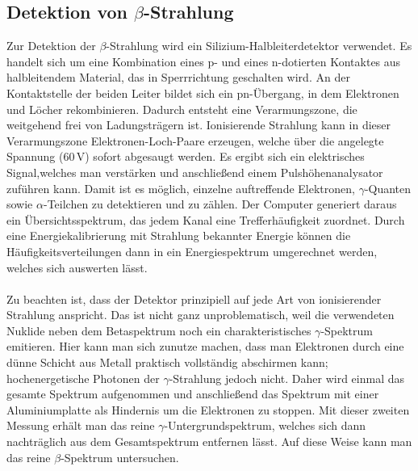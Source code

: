 \documentclass[german,  %
parskip=full,  %
]{scrartcl}
\begin{document}
\subsection{Detektion von $\beta$-Strahlung}
Zur Detektion der $\beta$-Strahlung wird ein Silizium-Halbleiterdetektor verwendet. Es handelt sich um eine Kombination eines p- und eines n-dotierten Kontaktes aus halbleitendem Material, das in Sperrrichtung geschalten wird. An der Kontaktstelle der beiden Leiter bildet sich ein pn-Übergang, in dem Elektronen und Löcher rekombinieren. Dadurch entsteht eine Verarmungszone, die weitgehend frei von Ladungsträgern ist. Ionisierende Strahlung kann in dieser Verarmungszone Elektronen-Loch-Paare erzeugen, welche über die angelegte Spannung ($60$\,V) sofort abgesaugt werden. Es ergibt sich ein elektrisches Signal,welches man verstärken und anschließend einem Pulshöhenanalysator zuführen kann. Damit ist es möglich, einzelne auftreffende Elektronen, \(\gamma\)-Quanten sowie \(\alpha\)-Teilchen zu detektieren und zu zählen. Der Computer generiert daraus ein Übersichtsspektrum, das jedem Kanal eine Trefferhäufigkeit zuordnet. Durch eine Energiekalibrierung mit Strahlung bekannter Energie können die Häufigkeitsverteilungen dann in ein Energiespektrum umgerechnet werden, welches sich auswerten lässt. \\\\
Zu beachten ist, dass der Detektor prinzipiell auf jede Art von ionisierender Strahlung anspricht. Das ist nicht ganz unproblematisch, weil die verwendeten Nuklide neben dem Betaspektrum noch ein charakteristisches \(\gamma\)-Spektrum emitieren. Hier kann man sich zunutze machen, dass man Elektronen durch eine dünne Schicht aus Metall praktisch vollständig abschirmen kann; hochenergetische Photonen der \(\gamma\)-Strahlung jedoch nicht. Daher wird einmal das gesamte Spektrum aufgenommen und anschließend das Spektrum mit einer Aluminiumplatte als Hindernis um die Elektronen zu stoppen. Mit dieser zweiten Messung erhält man das reine \(\gamma\)-Untergrundspektrum, welches sich dann nachträglich aus dem Gesamtspektrum entfernen lässt. Auf diese Weise kann man das reine \(\beta\)-Spektrum untersuchen.

\newpage
\end{document}
